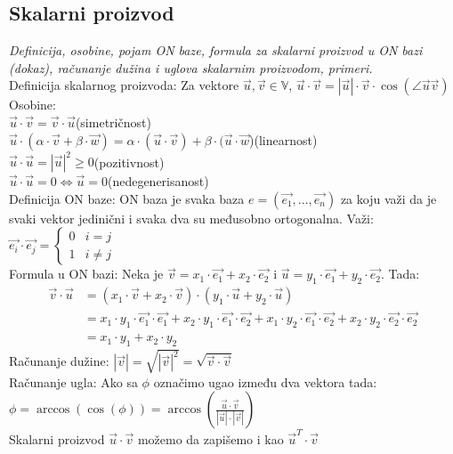 \documentclass[12pt]{article}
\newcommand{\vek}[1]{\overrightarrow{#1}}
\begin{document}
\subsection{Skalarni proizvod}
\textit{Definicija, osobine, pojam ON baze, formula za skalarni proizvod u ON
    bazi (dokaz), računanje dužina i uglova skalarnim proizvodom,
    primeri.}\\[1cm]
Definicija skalarnog proizvoda: Za vektore $\vek{u}, \vek{v}\in\mathbb{V}$, $\vek{u}\cdot\vek{v}=|\vek{u}|\cdot\vek{v}\cdot\cos(\angle{\vek{u}\vek{v}})$\\
Osobine:\\
$\vek{u}\cdot\vek{v}=\vek{v}\cdot\vek{u}$\hspace*{1cm}(simetričnost)\\
$\vek{u}\cdot(\alpha\cdot\vek{v}+\beta\cdot\vek{w})=\alpha\cdot(\vek{u}\cdot\vek{v})+\beta\cdot(\vek{u}\cdot\vek{w}$)\hspace*{1cm}(linearnost)\\
$\vek{u}\cdot\vek{u}=|\vek{u}|^2\geq0$\hspace*{1cm}(pozitivnost)\\
$\vek{u}\cdot\vek{u}=0\iff\vek{u}=0$\hspace*{1cm}(nedegenerisanost)\\
    Definicija ON baze: ON baza je svaka baza $e=(\vek{e_1}, ..., \vek{e_n})$ za koju važi
    da je svaki vektor jedinični i svaka dva su međusobno ortogonalna. Važi:
$\vek{e_i}\cdot\vek{e_j} = \begin{cases}
    0 & i=j     \\
    1 & i\neq j
\end{cases}$\\
    Formula u ON bazi:
    Neka je $\vek{v}=x_1\cdot\vek{e_1}+x_2\cdot\vek{e_2}$ i
$\vek{u}=y_1\cdot\vek{e_1}+y_2\cdot\vek{e_2}$.
    Tada:
    \begin{align*}
        \vek{v}\cdot\vek{u} & = (x_1\cdot\vek{v}+x_2\cdot\vek{v})\cdot(y_1\cdot\vek{u}+y_2\cdot\vek{u})                                                                                                     \\
                            & = x_1\cdot y_1\cdot \vek{e_1}\cdot \vek{e_1}+x_2\cdot y_1\cdot \vek{e_1}\cdot \vek{e_2}+x_1\cdot y_2\cdot \vek{e_1}\cdot \vek{e_2}+x_2\cdot y_2\cdot \vek{e_2}\cdot \vek{e_2} \\
                            & = x_1\cdot y_1+x_2\cdot y_2
    \end{align*}
    Računanje dužine: $|\vek{v}|=\sqrt{|\vek{v}|^2}=\sqrt{\vek{v}\cdot\vek{v}}$\\
    Računanje ugla: Ako sa $\phi$ označimo ugao između dva vektora tada:\\
$\phi=\arccos(\cos(\phi))=\arccos(\frac{\vek{u}\cdot\vek{v}}{|\vek{u}|\cdot|\vek{v}|})$\\
    Skalarni proizvod $\vek{u}\cdot\vek{v}$ možemo da zapišemo i kao $\vek{u}^T\cdot\vek{v}$
    \par
\end{document}
